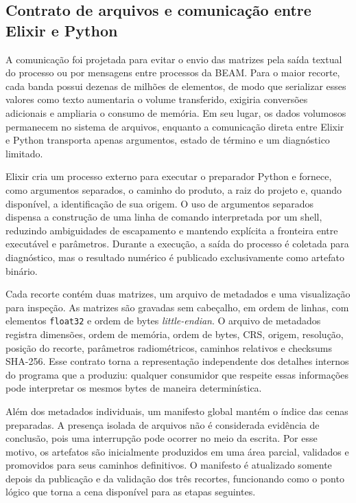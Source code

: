 \documentclass[tcc,capa]{texufpel}
\begin{document}
\subsection{Contrato de arquivos e comunicação entre Elixir e Python}

A comunicação foi projetada para evitar o envio das matrizes pela saída textual do
processo ou por mensagens entre processos da BEAM. Para o maior recorte, cada banda
possui dezenas de milhões de elementos, de modo que serializar esses valores como
texto aumentaria o volume transferido, exigiria conversões adicionais e ampliaria o
consumo de memória. Em seu lugar, os dados volumosos permanecem no sistema de
arquivos, enquanto a comunicação direta entre Elixir e Python transporta apenas
argumentos, estado de término e um diagnóstico limitado.

Elixir cria um processo externo para executar o preparador Python e fornece, como
argumentos separados, o caminho do produto, a raiz do projeto e, quando disponível,
a identificação de sua origem. O uso de argumentos separados dispensa a construção
de uma linha de comando interpretada por um shell, reduzindo ambiguidades de
escapamento e mantendo explícita a fronteira entre executável e parâmetros. Durante
a execução, a saída do processo é coletada para diagnóstico, mas o resultado
numérico é publicado exclusivamente como artefato binário.

Cada recorte contém duas matrizes, um arquivo de metadados e uma visualização para
inspeção. As matrizes são gravadas sem cabeçalho, em ordem de linhas, com elementos
\texttt{float32} e ordem de bytes \textit{little-endian}. O arquivo de metadados
registra dimensões, ordem de memória, ordem de bytes, CRS, origem, resolução,
posição do recorte, parâmetros radiométricos, caminhos relativos e checksums
SHA-256. Esse contrato torna a representação independente dos detalhes internos do
programa que a produziu: qualquer consumidor que respeite essas informações pode
interpretar os mesmos bytes de maneira determinística.

Além dos metadados individuais, um manifesto global mantém o índice das cenas
preparadas. A presença isolada de arquivos não é considerada evidência de conclusão,
pois uma interrupção pode ocorrer no meio da escrita. Por esse motivo, os artefatos
são inicialmente produzidos em uma área parcial, validados e promovidos para seus
caminhos definitivos. O manifesto é atualizado somente depois da publicação e da
validação dos três recortes, funcionando como o ponto lógico que torna a cena
disponível para as etapas seguintes.
\end{document}
